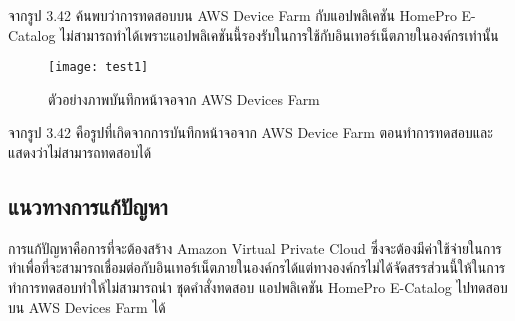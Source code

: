 จากรูป 3.42 ค้นพบว่าการทดสอบบน AWS Device Farm กับแอปพลิเคชัน HomePro E-Catalog ไม่สามารถทำได้เพราะแอปพลิเคชันนี้รองรับในการใช้กับอินเทอร์เน็ตภายในองค์กรเท่านั้น


\begin{figure}[H]
    \centering
    \texttt{[image: test1]}
    \caption{ตัวอย่างภาพบันทึกหน้าจอจาก AWS Devices Farm}
    \label{Fig:90}
\end{figure}

จากรูป 3.42 คือรูปที่เกิดจากการบันทึกหน้าจอจาก AWS Device Farm ตอนทำการทดสอบและแสดงว่าไม่สามารถทดสอบได้

\subsection{แนวทางการแก้ปัญหา}
การแก้ปัญหาคือการที่จะต้องสร้าง Amazon Virtual Private Cloud ซึ่งจะต้องมีค่าใช้จ่ายในการทำเพื่อที่จะสามารถเชื่อมต่อกับอินเทอร์เน็ตภายในองค์กรได้แต่ทางองค์กรไม่ได้จัดสรรส่วนนี้ให้ในการทำการทดสอบทำให้ไม่สามารถนำ ชุดคำสั่งทดสอบ แอปพลิเคชัน HomePro E-Catalog ไปทดสอบบน AWS Devices Farm ได้

\newpage
